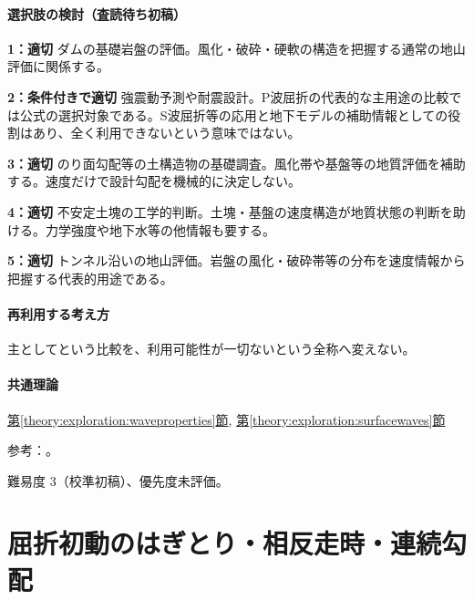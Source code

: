 \paragraph{選択肢の検討（査読待ち初稿）}\mbox{}\par

\noindent\textbf{1：適切} ダムの基礎岩盤の評価。風化・破砕・硬軟の構造を把握する通常の地山評価に関係する。\par

\noindent\textbf{2：条件付きで適切} 強震動予測や耐震設計。P波屈折の代表的な主用途の比較では公式の選択対象である。S波屈折等の応用と地下モデルの補助情報としての役割はあり、全く利用できないという意味ではない。\par

\noindent\textbf{3：適切} のり面勾配等の土構造物の基礎調査。風化帯や基盤等の地質評価を補助する。速度だけで設計勾配を機械的に決定しない。\par

\noindent\textbf{4：適切} 不安定土塊の工学的判断。土塊・基盤の速度構造が地質状態の判断を助ける。力学強度や地下水等の他情報も要する。\par

\noindent\textbf{5：適切} トンネル沿いの地山評価。岩盤の風化・破砕帯等の分布を速度情報から把握する代表的用途である。\par

\paragraph{再利用する考え方} 主としてという比較を、利用可能性が一切ないという全称へ変えない。

\paragraph{共通理論} \hyperref[theory:exploration:waveproperties]{第\ref*{theory:exploration:waveproperties}節}, \hyperref[theory:exploration:surfacewaves]{第\ref*{theory:exploration:surfacewaves}節}

\par 参考：\cite{segj_integrated2017,jica_refraction2015,japansea_spac2017}。

\par 難易度 3（校準初稿）、優先度未評価。

\section{屈折初動のはぎとり・相反走時・連続勾配}


